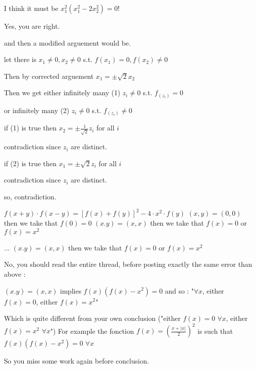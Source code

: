 \begin{solution}
	\begin{tcolorbox} I think it must be $ x_{1}^{2}(x_{1}^{2}-2x_{2}^{2})=0 $!\end{tcolorbox}

Yes, you are right.

and then a modified arguement would be.

let there is $ x_{1}\neq 0, x_{2}\neq 0 $ s.t. $ f(x_{1})=0,f(x_{2})\neq 0 $

Then by corrected arguement $x_{1}=\pm\sqrt{2} x_{2}$

Then we get either infinitely many  (1) $z_{i} \neq 0$ s.t. $f_(z_{i})=0$ 

                         or infinitely many (2) $z_{i} \neq 0$ s.t. $f_(z_{i}) \neq 0$

if (1) is true then $x_{2}=\pm\frac{1}{\sqrt{2}}z_{i}$ for all $i$ 

contradiction since $z_{i}$ are distinct.

if (2) is true then $x_{1}=\pm\sqrt{2}z_{i}$ for all $i$ 

contradiction since $z_{i}$ are distinct.

so, contradiction.
\end{solution}



\begin{solution}
	$ f(x+y) \cdot f(x-y) = [f(x) + f(y)]^2 - 4 \cdot x^2 \cdot f(y)   $
  $ (x,y) = (0,0) $ then we take that $ f(0) =0 $
  $ (x.y) = (x,x) $ then we take that $ f(x) =0 $ or  $ f(x) = x^2 $
\end{solution}



\begin{solution}
	\begin{tcolorbox}...
  $ (x.y) = (x,x) $ then we take that $ f(x) =0 $ or  $ f(x) = x^2 $\end{tcolorbox}
No, you should read the entire thread, before posting exactly the same error than above :

 $ (x.y) = (x,x) $ implies $f(x)(f(x)-x^2)=0$ and so : "$\forall x$, either $f(x)=0$, either $f(x)=x^2$"

Which is quite different from your own conclusion ("either $f(x)=0$ $\forall x$, either $f(x)=x^2$ $\forall x$")
For example the fonction $f(x)=\left(\frac{x+|x|}2\right)^2$ is such that $f(x)(f(x)-x^2)=0$ $\forall x$

So you miss some work again before conclusion.
\end{solution}



